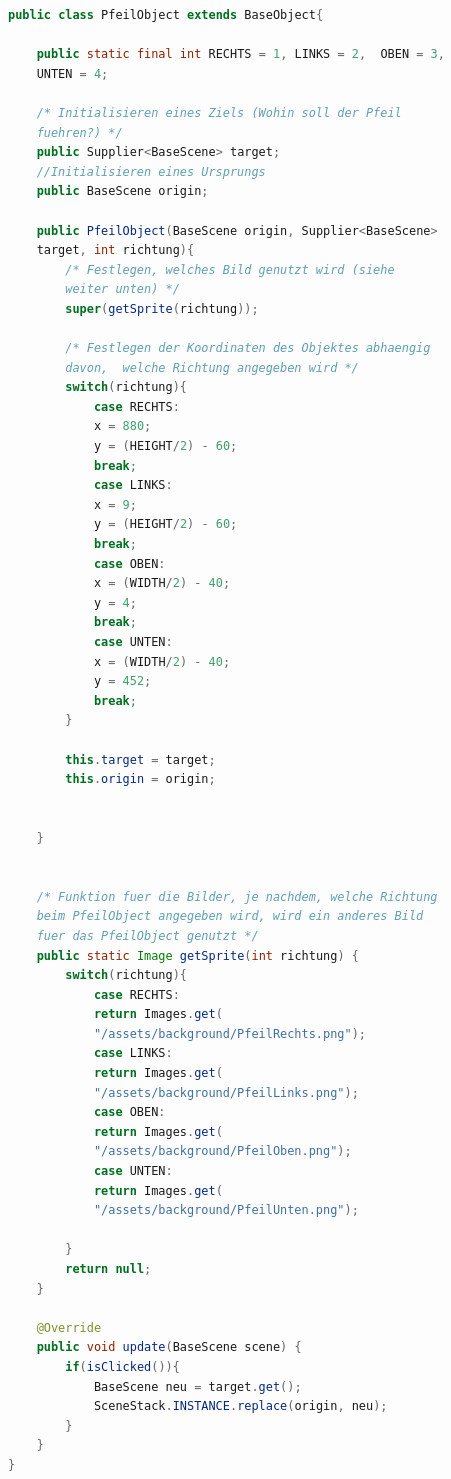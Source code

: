 \begin{lstlisting}[caption=PfeilObject, label=türobject, captionpos=t, language=Java]
public class PfeilObject extends BaseObject{
		
	public static final int RECHTS = 1, LINKS = 2, 	OBEN = 3,
	UNTEN = 4;
		
	/* Initialisieren eines Ziels (Wohin soll der Pfeil 
	fuehren?) */
	public Supplier<BaseScene> target;
	//Initialisieren eines Ursprungs
	public BaseScene origin;
		
	public PfeilObject(BaseScene origin, Supplier<BaseScene> 
	target, int richtung){
		/* Festlegen, welches Bild genutzt wird (siehe 
		weiter unten) */
		super(getSprite(richtung));
			
		/* Festlegen der Koordinaten des Objektes abhaengig 
		davon,	welche Richtung angegeben wird */
		switch(richtung){
			case RECHTS:
			x = 880;
			y = (HEIGHT/2) - 60;
			break;
			case LINKS:
			x = 9;
			y = (HEIGHT/2) - 60;
			break;
			case OBEN:
			x = (WIDTH/2) - 40;
			y = 4;
			break;
			case UNTEN:
			x = (WIDTH/2) - 40;
			y = 452;
			break;
		}
			
		this.target = target;
		this.origin = origin;
			
			
	}
		
		
	/* Funktion fuer die Bilder, je nachdem, welche Richtung 
	beim PfeilObject angegeben wird, wird ein anderes Bild 
	fuer das PfeilObject genutzt */
	public static Image getSprite(int richtung) {
		switch(richtung){
			case RECHTS:
			return Images.get(
			"/assets/background/PfeilRechts.png");
			case LINKS:
			return Images.get(
			"/assets/background/PfeilLinks.png");
			case OBEN:
			return Images.get(
			"/assets/background/PfeilOben.png");
			case UNTEN:
			return Images.get(
			"/assets/background/PfeilUnten.png");
				
		}
		return null;
	}
		
	@Override
	public void update(BaseScene scene) {
		if(isClicked()){
			BaseScene neu = target.get();
			SceneStack.INSTANCE.replace(origin, neu);
		}
	}
}
\end{lstlisting}

